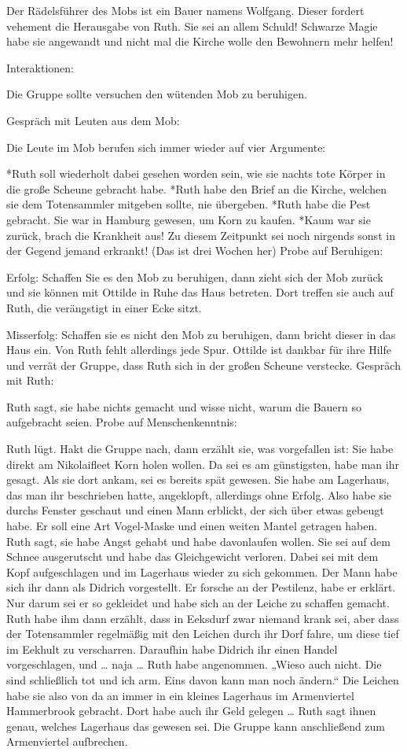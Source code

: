 Der Rädelsführer des Mobs ist ein Bauer namens Wolfgang. Dieser fordert vehement die Herausgabe von Ruth. Sie sei an allem Schuld! Schwarze Magie habe sie angewandt und nicht mal die Kirche wolle den Bewohnern mehr helfen!

Interaktionen:

Die Gruppe sollte versuchen den wütenden Mob zu beruhigen.

Gespräch mit Leuten aus dem Mob:

Die Leute im Mob berufen sich immer wieder auf vier Argumente:

*Ruth soll wiederholt dabei gesehen worden sein, wie sie nachts tote Körper in die große Scheune gebracht habe.
*Ruth habe den Brief an die Kirche, welchen sie dem Totensammler mitgeben sollte, nie übergeben.
*Ruth habe die Pest gebracht. Sie war in Hamburg gewesen, um Korn zu kaufen.
*Kaum war sie zurück, brach die Krankheit aus! Zu diesem Zeitpunkt sei noch nirgends sonst in der Gegend jemand erkrankt! (Das ist drei Wochen her)
Probe auf Beruhigen:

Erfolg: Schaffen Sie es den Mob zu beruhigen, dann zieht sich der Mob zurück und sie können mit Ottilde in Ruhe das Haus betreten.
Dort treffen sie auch auf Ruth, die verängstigt in
einer Ecke sitzt.

Misserfolg: Schaffen sie es nicht den Mob zu beruhigen, dann bricht dieser in das Haus ein.
Von Ruth fehlt allerdings jede Spur. Ottilde ist dankbar für ihre Hilfe und verrät der Gruppe,
dass Ruth sich in der großen Scheune verstecke.
Gespräch mit Ruth:

Ruth sagt, sie habe nichts gemacht und wisse nicht, warum die Bauern so aufgebracht seien.
Probe auf Menschenkenntnis:

Ruth lügt. Hakt die Gruppe nach, dann erzählt sie, was vorgefallen ist:
Sie habe direkt am Nikolaifleet Korn holen wollen. Da sei es am günstigsten, habe man ihr gesagt.
Als sie dort ankam, sei es bereits spät gewesen. Sie habe am Lagerhaus, das man ihr beschrieben hatte, angeklopft, allerdings ohne Erfolg.
Also habe sie durchs Fenster geschaut und einen Mann erblickt, der sich über etwas gebeugt habe. Er soll eine Art Vogel-Maske und einen weiten Mantel getragen haben.
Ruth sagt, sie habe Angst gehabt und habe davonlaufen wollen. Sie sei auf dem Schnee ausgerutscht und habe das Gleichgewicht verloren.
Dabei sei mit dem Kopf aufgeschlagen und im Lagerhaus wieder zu sich gekommen. Der Mann habe sich ihr dann als Didrich vorgestellt. Er forsche an der Pestilenz, habe er erklärt.
Nur darum sei er so gekleidet und habe sich an der Leiche zu schaffen gemacht. Ruth habe ihm dann erzählt, dass in Eeksdurf zwar niemand krank sei, aber dass der Totensammler regelmäßig mit den Leichen durch ihr Dorf fahre, um diese tief im Eekhult zu verscharren.
Daraufhin habe Didrich ihr einen Handel vorgeschlagen, und … naja … Ruth habe angenommen. „Wieso auch nicht. Die sind schließlich tot und ich arm. Eins davon kann man noch ändern.“
Die Leichen habe sie also von da an immer in ein kleines Lagerhaus im Armenviertel Hammerbrook gebracht. Dort habe auch ihr Geld gelegen …
Ruth sagt ihnen genau, welches Lagerhaus das gewesen sei. Die Gruppe kann anschließend zum Armenviertel aufbrechen.

